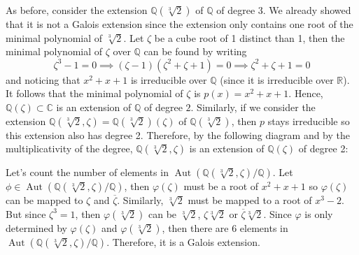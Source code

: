\documentclass{article}
\theoremstyle{plain}
\theoremstyle{definition}
\newcommand{\C}{\mathbb{C}}
\newcommand{\R}{\mathbb{R}}
\newcommand{\Q}{\mathbb{Q}}
\DeclareMathOperator{\Aut}{Aut}
\begin{document}
As before, consider the extension $\Q(\sqrt[3]{2})$ of $\Q$ of degree 3. We already showed that it is not a Galois extension since the extension only contains one root of the minimal polynomial of $\sqrt[3]{2}$. Let $\zeta$ be a cube root of 1 distinct than 1, then the minimal polynomial of $\zeta$ over $\Q$ can be found by writing
$$\zeta^3 - 1 = 0 \implies (\zeta - 1)(\zeta^2 + \zeta + 1) = 0 \implies \zeta^2 + \zeta + 1 = 0$$
and noticing that $x^2 + x + 1$ is irreducible over $\Q$ (since it is irreducible over $\R$). It follows that the minimal polynomial of $\zeta$ is $p(x) = x^2 + x + 1$. Hence, $\Q(\zeta) \subset \C$ is an extension of $\Q$ of degree $2$. Similarly, if we consider the extension $\Q(\sqrt[3]{2}, \zeta) = \Q(\sqrt[3]{2})(\zeta)$ of $\Q(\sqrt[3]{2})$, then $p$ stays irreducible so this extension also has degree 2. Therefore, by the following diagram and by the multiplicativity of the degree, $\Q(\sqrt[3]{2}, \zeta)$ is an extension of $\Q(\zeta)$ of degree 2:
\begin{center}
\end{center}
Let's count the number of elements in $\Aut(\Q(\sqrt[3]{2}, \zeta) / \Q)$. Let $\phi \in \Aut(\Q(\sqrt[3]{2}, \zeta) / \Q)$, then $\varphi(\zeta)$ must be a root of $x^2 + x + 1$ so $\varphi(\zeta)$ can be mapped to $\zeta$ and $\overline{\zeta}$. Similarly, $\sqrt[3]{2}$ must be mapped to a root of $x^3 - 2$. But since $\zeta^3 = 1$, then $\varphi(\sqrt[3]{2})$ can be $\sqrt[3]{2}$, $\zeta\sqrt[3]{2}$ or $\overline{\zeta} \sqrt[3]{2}$. Since $\varphi$ is only determined by $\varphi(\zeta)$ and $\varphi(\sqrt[3]{2})$, then there are 6 elements in $\Aut(\Q(\sqrt[3]{2}, \zeta) / \Q)$. Therefore, it is a Galois extension. 
\end{document}
